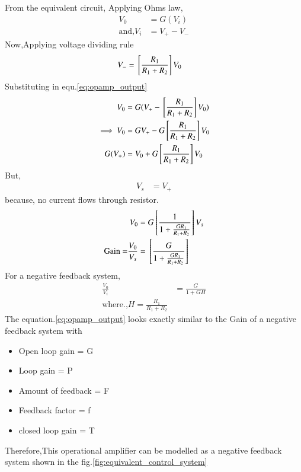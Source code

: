 \begin{enumerate}[label=\thesubsection.\arabic*.,ref=\thesubsection.\theenumi]
\begin{figure}[!ht]
\begin{center}
		\resizebox{\columnwidth}{!}{}
	\end{center}
\caption{}
\label{fig:equivalent_circuit}
\end{figure}
From the equivalent circuit,
Applying Ohms law,
\begin{align}
V_0 &= G(V_i) \label{eq:opamp_output}\\
\text{and,} V_i &= V_+-V_-
\end{align}
Now,Applying voltage dividing rule
\begin{align}
V_- &= {}\left[\frac{R_1}{R_1+R_2}\right]V_0
\end{align}
Substituting in equ.\ref{eq:opamp_output}
\begin{align}
    V_0 &= G(V_+-{}\left[\frac{R_1}{R_1+R_2}\right]V_0)
    \\
\implies V_0 &= GV_+-G{}\left[\frac{R_1}{R_1+R_2}\right]V_0
    \\
G(V_+)&=V_0+G{}\left[\frac{R_1}{R_1+R_2}\right]V_0
\end{align}
But,
\begin{align}
    V_s &= V_+
\end{align}
because, no current flows through resistor.  
\begin{align}
    V_0 &= G{}\left[\frac{1}{1+\frac{GR_1}{R_1+R_2}}\right]V_s
    \\
 \text{Gain =}\frac{V_0}{V_s}&={}\left[\frac{G}{1+\frac{GR_1}{R_1+R_2}}\right]\label{eq:opamp_gain}
\end{align}
For a negative feedback system,
\begin{align}
   \frac{V_0}{V_i} &= \frac{G}{1+GH}
  \\
  \text{where.,} H = \frac{R_1}{R_1+R_2}
\end{align}
The equation.\ref{eq:opamp_output} looks exactly similar to the Gain of a negative feedback system with
\begin{itemize}
    \item Open loop gain = G
    \item Loop gain = P 
    \item Amount of feedback = F
    \item Feedback factor = f
    \item closed loop gain = T
\end{itemize}
\begin{table}[!ht]
\centering

\caption{}
\label{table: Output_Table}
\end{table}
Therefore,This operational amplifier can be modelled as a negative feedback system shown in the fig.\ref{fig:equivalent_control_system}

\end{enumerate}
